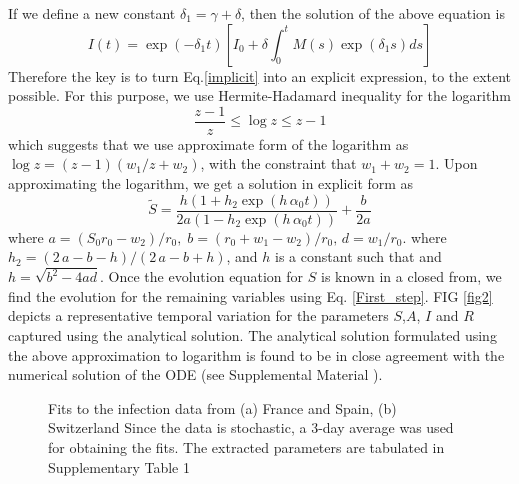 \documentclass[aps,prl,reprint,superscriptaddress]{revtex4-1}
\begin{document}
	If we define a new constant $\delta_1 = \gamma + \delta $, then the
	solution of the above equation is
	\begin{equation}
	I(t) = \exp(-\delta_1 t) \left[ I_0 + \delta \int_0^t M(s) \exp(\delta_1 s) ds \right]
	\end{equation}
Therefore the key is to turn Eq.\eqref{implicit} into an explicit expression,
	to the extent possible.
	For this purpose,
	we use Hermite-Hadamard inequality for the logarithm \cite{atif}
	\begin{equation}
	\frac{z-1}{z}\leq \log{z}\leq z-1
	\end{equation}
	which suggests that we use approximate form of the logarithm as $\log{z}=(z-1)(w_1/z +  w_2)$,  with the constraint that $w_1 + w_2 = 1$. Upon approximating the logarithm, we  get a solution in explicit form as 
	\begin{equation}
	\tilde{S} = \frac{h   (1+ h_2 \exp(h \, \alpha_0 t)) }{2a   \left(1-h_2 \exp(h \, \alpha_0 t)\right)}
	+\frac{b}{2a}
	\end{equation}
	where $ a = (S_0 r_0 -  w_2)/ r_0, \; 
	b=   \left(r_0 +  w_1-  w_2\right)/r_0, \,  d=  w_1/{r_0}$.
	where $h_2 =    (2\, a-b-h)/(2\, a-b+h)$,  and $h$ is a constant such that and $h=\sqrt{b^2-4ad}$. Once the evolution equation for $S$ is known in a closed from, we find the evolution for the remaining variables using Eq. \eqref{First_step}. FIG \ref{fig2} depicts a representative temporal variation for the parameters $S$,$A$, $I$ and $R$ captured using the analytical solution. The analytical solution formulated using the above approximation to logarithm is found to be in close agreement with the numerical solution of the ODE (see Supplemental Material \cite{supp}).     
\begin{figure}[h]
\caption{\label{fig3} Fits to the infection data from (a) France and Spain, (b) Switzerland Since the data is stochastic, a 3-day average was used for obtaining the fits. The extracted parameters are tabulated in Supplementary Table 1 } 
\end{figure}
\end{document}
